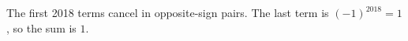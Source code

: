 The first 2018 terms cancel in opposite-sign pairs. The last term is $(-1)^{2018}=1$, so the sum is $\boxed1$.
